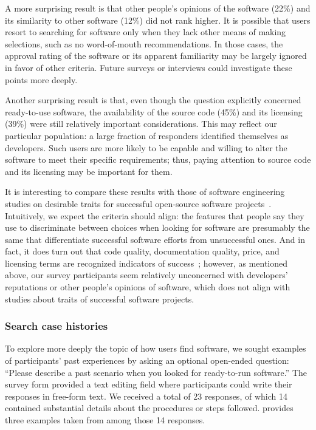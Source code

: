 \documentclass{casicswhitepaper}
\begin{document}
A more surprising result is that other people's opinions of the software (22\%) and its similarity to other software (12\%) did not rank higher.  It is possible that users resort to searching for software only when they lack other means of making selections, such as no word-of-mouth recommendations. In those cases, the approval rating of the software or its apparent familiarity may be largely ignored in favor of other criteria.  Future surveys or interviews could investigate these points more deeply.

Another surprising result is that, even though the question explicitly concerned ready-to-use software, the availability of the source code (45\%) and its licensing (39\%) were still relatively important considerations. This may reflect our particular population: a large fraction of responders identified themselves as developers. Such users are more likely to be capable and willing to alter the software to meet their specific requirements; thus, paying attention to source code and its licensing may be important for them.

It is interesting to compare these results with those of software engineering studies on desirable traits for successful open-source software projects~\cite[e.g.,][]{subramaniam2009determinants, lee2009measuring, crowston2003defining, crowston2006information, sen2012open, lee2009measuring}.  Intuitively, we expect the criteria should align: the features that people say they use to discriminate between choices when looking for software are presumably the same that differentiate successful software efforts from unsuccessful ones.  And in fact, it does turn out that code quality, documentation quality, price, and licensing terms are recognized indicators of success~\cite{subramaniam2009determinants, lee2009measuring, crowston2003defining, crowston2006information}; however, as mentioned above, our survey participants seem relatively unconcerned with developers' reputations or other people's opinions of software, which does not align with studies about traits of successful software projects.


\subsubsection{Search case histories}

To explore more deeply the topic of how users find software, we sought examples of participants' past experiences by asking an optional open-ended question: ``Please describe a past scenario when you looked for ready-to-run software.''  The survey form provided a text editing field where participants could write their responses in free-form text.  We received a total of 23 responses, of which 14 contained substantial details about the procedures or steps followed.   provides three examples taken from among those 14 responses.
\end{document}
